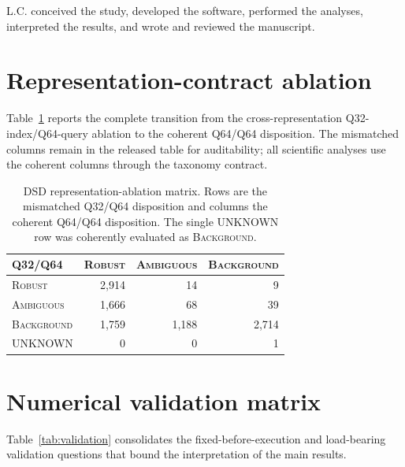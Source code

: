 \documentclass[12pt]{article}
\newcommand{\robust}{\textsc{Robust}}
\newcommand{\ambiguous}{\textsc{Ambiguous}}
\newcommand{\background}{\textsc{Background}}
\begin{document}
L.C. conceived the study, developed the software, performed the analyses,
interpreted the results, and wrote and reviewed the manuscript.

\appendix

\section{Representation-contract ablation}

Table~\ref{tab:transition} reports the complete transition from the
cross-representation Q32-index/Q64-query ablation to the coherent Q64/Q64
disposition.  The mismatched columns remain in the released table for
auditability; all scientific analyses use the coherent columns through the
taxonomy contract.

\begin{table}[htbp]
\centering
\caption{DSD representation-ablation matrix.  Rows are the mismatched
Q32/Q64 disposition and columns the coherent Q64/Q64 disposition.  The single
UNKNOWN row was
coherently evaluated as \background.}
\label{tab:transition}
\begin{tabular}{lrrr}
\toprule
Q32/Q64 & \robust & \ambiguous & \background \\
\midrule
\robust & 2,914 & 14 & 9 \\
\ambiguous & 1,666 & 68 & 39 \\
\background & 1,759 & 1,188 & 2,714 \\
UNKNOWN & 0 & 0 & 1 \\
\bottomrule
\end{tabular}
\end{table}

\section{Numerical validation matrix}

Table~\ref{tab:validation} consolidates the fixed-before-execution and
load-bearing validation questions that bound the interpretation of the main
results.
\end{document}
